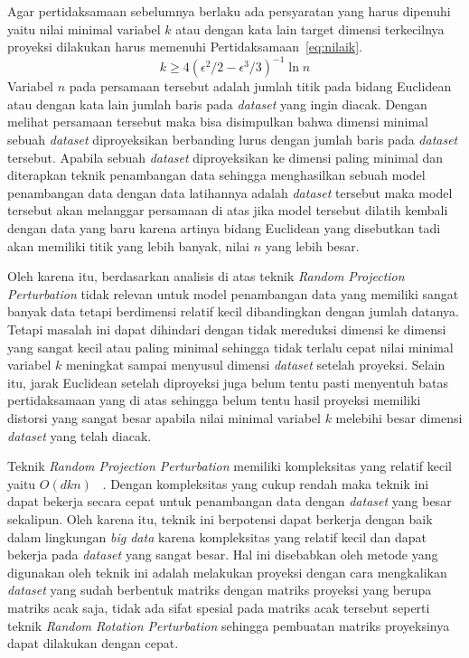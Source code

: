 Agar pertidaksamaan sebelumnya berlaku ada persyaratan yang harus dipenuhi yaitu nilai minimal variabel \(k\) atau dengan kata lain target dimensi terkecilnya proyeksi dilakukan harus memenuhi Pertidaksamaan~\ref{eq:nilaik}.
\begin{equation}\label{eq:nilaik}
	k \geq 4(\epsilon^{2}/2-\epsilon^{3}/3)^{-1}\ln{n}
\end{equation}
Variabel \(n\) pada persamaan tersebut adalah jumlah titik pada bidang Euclidean atau dengan kata lain jumlah baris pada \textit{dataset} yang ingin diacak. Dengan melihat persamaan tersebut maka bisa disimpulkan bahwa dimensi minimal sebuah \textit{dataset} diproyeksikan berbanding lurus dengan jumlah baris pada \textit{dataset} tersebut. Apabila sebuah \textit{dataset} diproyeksikan ke dimensi paling minimal dan diterapkan teknik penambangan data sehingga menghasilkan sebuah model penambangan data dengan data latihannya adalah \textit{dataset} tersebut maka model tersebut akan melanggar persamaan di atas jika model tersebut dilatih kembali dengan data yang baru karena artinya bidang Euclidean yang disebutkan tadi akan memiliki titik yang lebih banyak, nilai \(n\) yang lebih besar. 

Oleh karena itu, berdasarkan analisis di atas teknik \textit{Random Projection Perturbation} tidak relevan untuk model penambangan data yang memiliki sangat banyak data tetapi berdimensi relatif kecil dibandingkan dengan jumlah datanya. Tetapi masalah ini dapat dihindari dengan tidak mereduksi dimensi ke dimensi yang sangat kecil atau paling minimal sehingga tidak terlalu cepat nilai minimal variabel \(k\) meningkat sampai menyusul dimensi \textit{dataset} setelah proyeksi. Selain itu, jarak Euclidean setelah diproyeksi juga belum tentu pasti menyentuh batas pertidaksamaan yang di atas sehingga belum tentu hasil proyeksi memiliki distorsi yang sangat besar apabila nilai minimal variabel \(k\) melebihi besar dimensi \textit{dataset} yang telah diacak.

Teknik \textit{Random Projection Perturbation} memiliki kompleksitas yang relatif kecil yaitu \(O(dkn)\) ~\cite{bingham:01:projection}. Dengan kompleksitas yang cukup rendah maka teknik ini dapat bekerja secara cepat untuk penambangan data dengan \textit{dataset} yang besar sekalipun. Oleh karena itu, teknik ini berpotensi dapat berkerja dengan baik dalam lingkungan \textit{big data} karena kompleksitas yang relatif kecil dan dapat bekerja pada \textit{dataset} yang sangat besar. Hal ini disebabkan oleh metode yang digunakan oleh teknik ini adalah melakukan proyeksi dengan cara mengkalikan \textit{dataset} yang sudah berbentuk matriks dengan matriks proyeksi yang berupa matriks acak saja, tidak ada sifat spesial pada matriks acak tersebut seperti teknik \textit{Random Rotation Perturbation} sehingga pembuatan matriks proyeksinya dapat dilakukan dengan cepat.

